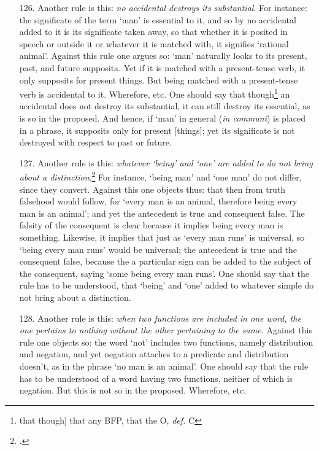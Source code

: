\begin{itemize}
\item[126.] Another rule is this: \textit{no accidental destroys its substantial}. For instance: the significate of the term `man' is essential to it, and so by no accidental added to it is its significate taken away, so that whether it is posited in speech or outside it or whatever it is matched with, it signifies `rational animal'. Against this rule one argues so: `man' naturally looks to its present, past, and future supposita. Yet if it is matched with a present-tense verb, it only supposits for present things. But being matched with a present-tense verb is accidental to it. Wherefore, etc. One should say that though\footnote{that though] that any BFP, that the O, \textit{def.} C} an accidental does not destroy its substantial, it can still destroy its essential, as is so in the proposed. And hence, if `man' in general (\textit{in communi}) is placed in a phrase, it supposits only for present [things]; yet its significate is not destroyed with respect to past or future.
\item[127.] Another rule is this: \textit{whatever `being' and `one' are added to do not bring about a distinction}.\footnote{\cite[IV, c. 2, p. 1003.24]{Metaph}.} For instance, `being man' and `one man' do not differ, since they convert. Against this one objects thus: that then from truth falsehood would follow, for `every man is an animal, therefore being every man is an animal'; and yet the antecedent is true and consequent false. The falsity of the consequent is clear because it implies being every man is something. Likewise, it implies that just as `every man runs' is universal, so `being every man runs' would be universal; the antecedent is true and the consequent false, because the a particular sign can be added to the subject of the consequent, saying `some being every man runs'. One should say that the rule has to be understood, that `being' and `one' added to whatever simple do not bring about a distinction.
\item[128.] Another rule is this: \textit{when two functions are included in one word, the one pertains to nothing without the other pertaining to the same.} Against this rule one objects so: the word `not' includes two functions, namely distribution and negation, and yet negation attaches to a predicate and distribution doesn't, as in the phrase `no man is an animal'. One should say that the rule has to be understood of a word having two functions, neither of which is negation. But this is not so in the proposed. Wherefore, etc.

\end{itemize}
